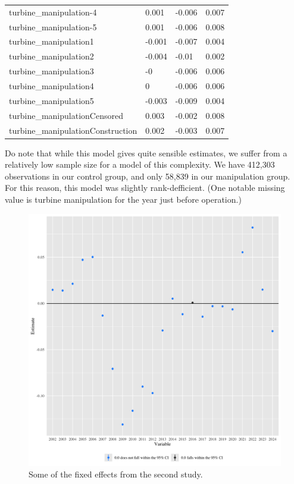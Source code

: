 \documentclass{article}
\begin{document}
\begin{table}[]
\begin{tabular}{llll}
turbine\_manipulation-4           & 0.001             & -0.006         & 0.007           \\
turbine\_manipulation-5           & 0.001             & -0.006         & 0.008           \\
turbine\_manipulation1            & -0.001            & -0.007         & 0.004           \\
turbine\_manipulation2            & -0.004            & -0.01          & 0.002           \\
turbine\_manipulation3            & -0                & -0.006         & 0.006           \\
turbine\_manipulation4            & 0                 & -0.006         & 0.006           \\
turbine\_manipulation5            & -0.003            & -0.009         & 0.004           \\
turbine\_manipulationCensored     & 0.003             & -0.002         & 0.008           \\
turbine\_manipulationConstruction & 0.002             & -0.003         & 0.007          
\end{tabular}
\end{table}

Do note that while this model gives quite sensible estimates, we suffer from a relatively low sample size for a model of this complexity.
We have 412,303 observations in our control group, and only 58,839 in our manipulation group.
For this reason, this model was slightly rank-defficient.
(One notable missing value is turbine manipulation for the year just before operation.)

\begin{figure}[h]
\centering
\includegraphics[width=0.9\linewidth]
{fixef_general.png} 
\caption{Some of the fixed effects from the second study.}
\label{fixef_general}
\end{figure}
\end{document}
